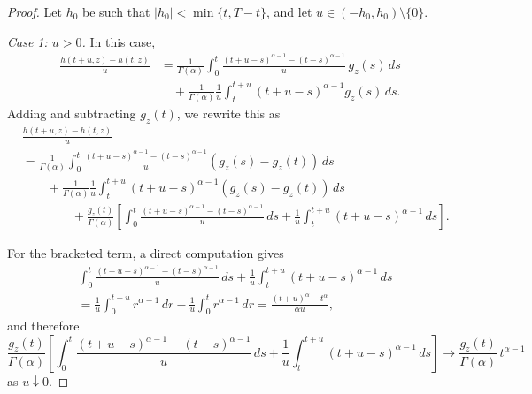 \documentclass[10pt,a4paper]{amsart}
\begin{document}
\begin{proof}
Let $h_0$ be such that $|h_0|<\min\{t,T-t\}$, and let
$u\in(-h_0,h_0)\setminus\{0\}$.

\smallskip
\noindent
\emph{Case 1: $u>0$.}
In this case,
\begin{align*}
  \frac{h(t+u,z)-h(t,z)}{u}
  &=
  \frac{1}{\Gamma(\alpha)}
  \int_0^t
  \frac{(t+u-s)^{\alpha-1}-(t-s)^{\alpha-1}}{u}\,g_z(s)\,ds
  \\
  &\quad+
  \frac{1}{\Gamma(\alpha)}
  \frac{1}{u}\int_t^{t+u}(t+u-s)^{\alpha-1}g_z(s)\,ds.
\end{align*}
Adding and subtracting $g_z(t)$, we rewrite this as
\begin{align}
  &\frac{h(t+u,z)-h(t,z)}{u}\nonumber\\
  &=
  \frac{1}{\Gamma(\alpha)}
  \int_0^t
  \frac{(t+u-s)^{\alpha-1}-(t-s)^{\alpha-1}}{u}
  \left(g_z(s)-g_z(t)\right)\,ds
  \nonumber\\
  &\qquad+
  \frac{1}{\Gamma(\alpha)}
  \frac{1}{u}\int_t^{t+u}(t+u-s)^{\alpha-1}
  \left(g_z(s)-g_z(t)\right)\,ds
  \nonumber\\
  &\qquad\qquad+
  \frac{g_z(t)}{\Gamma(\alpha)}
  \left[
    \int_0^t
    \frac{(t+u-s)^{\alpha-1}-(t-s)^{\alpha-1}}{u}\,ds
    +
    \frac{1}{u}\int_t^{t+u}(t+u-s)^{\alpha-1}\,ds
  \right].
  \label{eq:dq-split-proof-pos}
\end{align}

For the bracketed term, a direct computation gives
\begin{align*}
  &\int_0^t
    \frac{(t+u-s)^{\alpha-1}-(t-s)^{\alpha-1}}{u}\,ds
    +
    \frac{1}{u}\int_t^{t+u}(t+u-s)^{\alpha-1}\,ds
  \\
  &=
  \frac{1}{u}\int_0^{t+u}r^{\alpha-1}\,dr
  -
  \frac{1}{u}\int_0^t r^{\alpha-1}\,dr
  =
  \frac{(t+u)^\alpha-t^\alpha}{\alpha u},
\end{align*}
and therefore
\begin{equation}\label{eq:bracket-limit-pos}
  \frac{g_z(t)}{\Gamma(\alpha)}
  \left[
    \int_0^t
    \frac{(t+u-s)^{\alpha-1}-(t-s)^{\alpha-1}}{u}\,ds
    +
    \frac{1}{u}\int_t^{t+u}(t+u-s)^{\alpha-1}\,ds
  \right]
  \to
  \frac{g_z(t)}{\Gamma(\alpha)}\,t^{\alpha-1}
\end{equation}
as $u\downarrow0$.


\end{proof}
\end{document}
